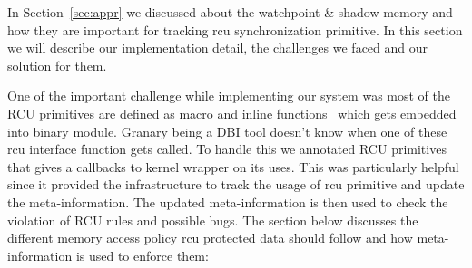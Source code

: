 In Section~\ref{sec:appr} we discussed about the watchpoint \& shadow memory and how they are important for tracking rcu synchronization primitive.
In this section we will describe our implementation detail, the challenges we faced and our solution for them.

One of the important challenge while implementing our system was most of the RCU primitives are defined as macro and inline functions~\cite{PaulEdwardMcKenneyPhD} which gets embedded into binary module. Granary being a DBI tool doesn’t know when one of these rcu interface function gets called. To handle this we annotated RCU primitives that gives a callbacks to kernel wrapper on its uses. This was particularly helpful since it provided the infrastructure to track the usage of rcu primitive and update the meta-information. The updated meta-information is then used to check the violation of RCU rules and possible bugs. The section below discusses the different memory access policy rcu protected data should follow and how meta-information is used to enforce them: 

